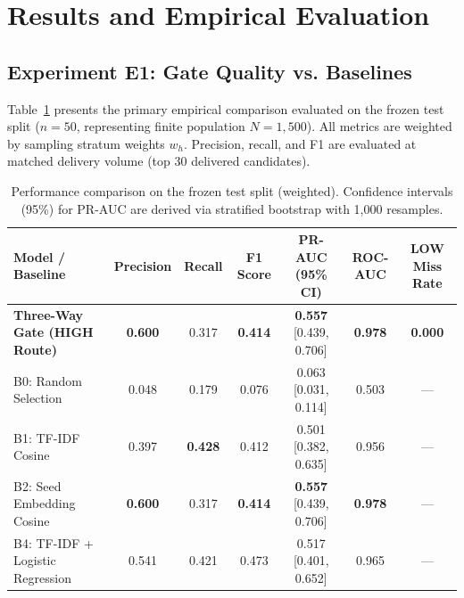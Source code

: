 \section{Results and Empirical Evaluation}
\label{sec:results}

\subsection{Experiment E1: Gate Quality vs. Baselines}
\label{sec:exp_e1}

Table~\ref{tab:gate_performance} presents the primary empirical comparison evaluated on the frozen test split ($n=50$, representing finite population $N=1,500$). All metrics are weighted by sampling stratum weights $w_h$. Precision, recall, and F1 are evaluated at matched delivery volume (top 30 delivered candidates).

\begin{table}[t]
\centering
\caption{Performance comparison on the frozen test split (weighted). Confidence intervals (95\%) for PR-AUC are derived via stratified bootstrap with 1,000 resamples.}
\label{tab:gate_performance}
\begin{tabular}{lcccccc}
\toprule
\textbf{Model / Baseline} & \textbf{Precision} & \textbf{Recall} & \textbf{F1 Score} & \textbf{PR-AUC (95\% CI)} & \textbf{ROC-AUC} & \textbf{LOW Miss Rate} \\
\midrule
\textbf{Three-Way Gate (HIGH Route)} & \textbf{0.600} & 0.317 & \textbf{0.414} & \textbf{0.557} [0.439, 0.706] & \textbf{0.978} & \textbf{0.000} \\
B0: Random Selection & 0.048 & 0.179 & 0.076 & 0.063 [0.031, 0.114] & 0.503 & --- \\
B1: TF-IDF Cosine & 0.397 & \textbf{0.428} & 0.412 & 0.501 [0.382, 0.635] & 0.956 & --- \\
B2: Seed Embedding Cosine & \textbf{0.600} & 0.317 & \textbf{0.414} & \textbf{0.557} [0.439, 0.706] & \textbf{0.978} & --- \\
B4: TF-IDF + Logistic Regression & 0.541 & 0.421 & 0.473 & 0.517 [0.401, 0.652] & 0.965 & --- \\
\bottomrule
\end{tabular}
\end{table}

